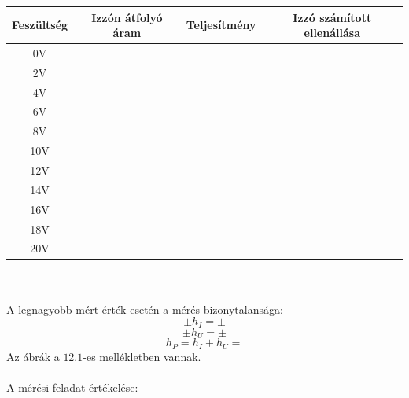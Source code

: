 \documentclass[10pt,a4paper]{article}
\begin{document}
\begin{tabular}{|c|c|c|c|}
\hline 
Feszültség & Izzón átfolyó áram & Teljesítmény & Izzó számított ellenállása \\ 
\hline 
0V & &  &  \\ 
\hline 
2V &  &  & \\ 
\hline 
4V &  &  &  \\ 
\hline 
6V &  &  &  \\ 
\hline 
8V &  &  &  \\ 
\hline 
10V &  & &  \\ 
\hline 
12V & &  &  \\ 
\hline 
14V & & &  \\ 
\hline 
16V &  &  &  \\ 
\hline 
18V &  &  &  \\ 
\hline 
20V &  &  &  \\ 
\hline 
\end{tabular} \\\\


\newpage
A legnagyobb mért érték esetén a mérés bizonytalansága:$$\pm h_I=\pm $$ $$\pm h_U = \pm $$ $$h_P = h_I + h_U = $$
Az ábrák a $12.1$-es mellékletben vannak.\\\\
A mérési feladat értékelése:$$$$ $$$$ $$$$
\end{document}
